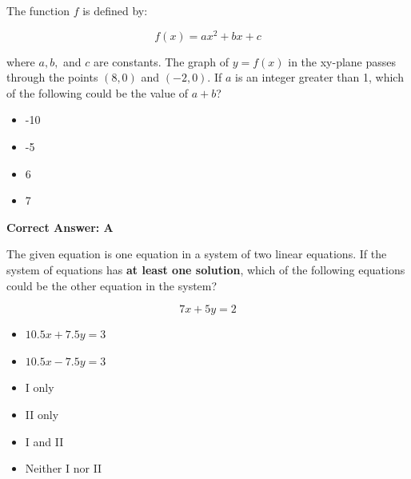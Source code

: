 \documentclass{article}
\begin{document}
\vspace{20pt}

\begin{tcolorbox}[colback=blue!5!white,colframe=blue!75!black,title=Question 13]
The function \( f \) is defined by:

\[
f(x) = ax^2 + bx + c
\]

where \( a, b, \) and \( c \) are constants. The graph of \( y = f(x) \) in the xy-plane passes through the points \( (8,0) \) and \( (-2,0) \). If \( a \) is an integer greater than 1, which of the following could be the value of \( a + b \)?

\begin{itemize}
    \item[A.] -10
    \item[B.] -5
    \item[C.] 6
    \item[D.] 7
\end{itemize}
\end{tcolorbox}

\begin{tcolorbox}[colback=green!10, colframe=green!50!black,title=Answer to Question 13]
\textbf{Correct Answer: A}  
\end{tcolorbox}

\vspace{20pt}

\begin{tcolorbox}[colback=blue!5!white,colframe=blue!75!black,title=Question 14]
The given equation is one equation in a system of two linear equations. If the system of equations has \textbf{at least one solution}, which of the following equations could be the other equation in the system?

\[
7x + 5y = 2
\]

\begin{itemize}
    \item[I.] \( 10.5x + 7.5y = 3 \)
    \item[II.] \( 10.5x - 7.5y = 3 \)
\end{itemize}

\begin{itemize}
    \item[A.] I only
    \item[B.] II only
    \item[C.] I and II
    \item[D.] Neither I nor II
\end{itemize}
\end{tcolorbox}
\end{document}
